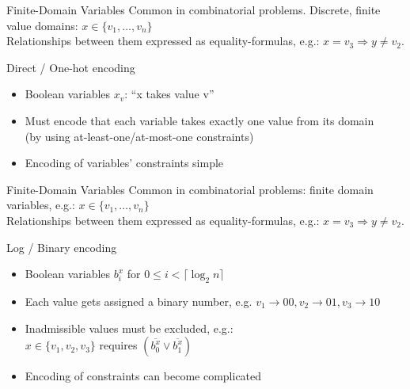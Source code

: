 \documentclass[t]{sdqbeamer}
\begin{document}
\begin{frame}{Finite-Domain Variables}
	Common in combinatorial problems. Discrete, finite value domains: $x \in \{ v_1, \dots, v_n \}$\\[1ex]
	Relationships between them expressed as equality-formulas, e.g.: $x = v_3 \Rightarrow y \neq v_2$.
	\begin{block}{Direct / One-hot encoding}
		\begin{itemize}\setlength{\itemsep}{1em}
		\item Boolean variables $x_v$: ``x takes value v''
		\item Must encode that each variable takes exactly one value from its domain\\
			(by using at-least-one/at-most-one constraints)
		\item Encoding of variables' constraints simple
		\end{itemize}
	\end{block}
\end{frame}
\begin{frame}{Finite-Domain Variables}
	Common in combinatorial problems: finite domain variables, e.g.: $x \in \{ v_1, \dots, v_n \}$\\[1ex]
	Relationships between them expressed as equality-formulas, e.g.: $x = v_3 \Rightarrow y \neq v_2$.
	\begin{block}{Log / Binary encoding}
		\begin{itemize}\setlength{\itemsep}{1em}
		\item Boolean variables $b^x_i$ for $0 \leq i < \lceil \log_2{n} \rceil$
		\item Each value gets assigned a binary number, e.g. $v_1 \rightarrow 00, v_2 \rightarrow 01, v_3 \rightarrow 10$
		\item Inadmissible values must be excluded, e.g.: \\
			$x \in \{ v_1, v_2, v_3 \}$ requires $(\overline{b^x_0} \lor \overline{b^x_1})$
		\item Encoding of constraints can become complicated
		\end{itemize}
	\end{block}
\end{frame}
\end{document}

